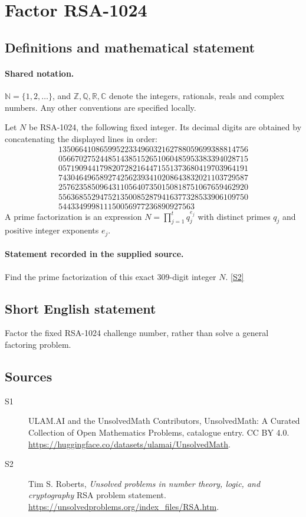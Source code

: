 \documentclass[11pt]{article}
\newcommand{\sref}[2]{\hyperlink{source:#1:#2}{[S#2]}}
\begin{document}
\section{Factor RSA-1024}\label{statement}

\subsection{Definitions and mathematical statement}

\paragraph{Shared notation.}$\mathbb N=\{1,2,\ldots\}$, and $\mathbb Z,\mathbb Q,\mathbb R,\mathbb C$ denote the integers, rationals, reals and complex numbers. Any other conventions are specified locally.


Let $N$ be RSA-1024, the following fixed integer. Its decimal digits are obtained by concatenating the displayed lines in order:
\[\begin{gathered}
1350664108659952233496032162788059699388814756\\
0566702752448514385152651060485953383394028715\\
0571909441798207282164471551373680419703964191\\
7430464965892742562393410208643832021103729587\\
2576235850964311056407350150818751067659462920\\
5563685529475213500852879416377328533906109750\\
544334999811150056977236890927563
\end{gathered}\]
A prime factorization is an expression $N=\prod_{j=1}^{t}q_j^{e_j}$ with distinct primes $q_j$ and positive integer exponents $e_j$.
\paragraph{Statement recorded in the supplied source.}
Find the prime factorization of this exact 309-digit integer $N$. \sref{statement}{2}
\subsection{Short English statement}
Factor the fixed RSA-1024 challenge number, rather than solve a general factoring problem.
\subsection{Sources}
\begin{description}
\item[\hypertarget{source:statement:1}{S1}] ULAM.AI and the UnsolvedMath Contributors, UnsolvedMath: A Curated Collection of Open Mathematics Problems, catalogue entry. CC BY 4.0. \url{https://huggingface.co/datasets/ulamai/UnsolvedMath}.
\item[\hypertarget{source:statement:2}{S2}] Tim S. Roberts, \emph{Unsolved problems in number theory, logic, and cryptography} RSA problem statement. \url{https://unsolvedproblems.org/index_files/RSA.htm}.
\end{description}
\label{end:statement}
\end{document}
